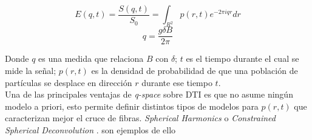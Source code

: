 $$E(q,t) =  \frac{S(q,t)}{S_0} = \int_{R^2}{p(r,t)e^{-2\pi i q r} dr} $$
$$ q = \frac{g \delta B}{2\pi} $$

Donde $q$ es una medida que relaciona $B$ con $\delta$; $t$ es el tiempo durante
el cual se mide la se\~nal; $p(r,t)$ es la densidad de probabilidad de que una
poblaci\'on de part\'iculas se desplace en direcci\'on $r$ durante ese tiempo $t$.\\

Una de las principales ventajas de \textit{q-space} sobre DTI es que no asume
ning\'un modelo a priori, esto permite definir distintos tipos de modelos para
$p(r,t)$ que caracterizan mejor el cruce de fibras. \textit{Spherical Harmonics}
\cite{Tuch2004} o \textit{Constrained Spherical Deconvolution} \cite{Tournier2004}.
son ejemplos de ello \\
